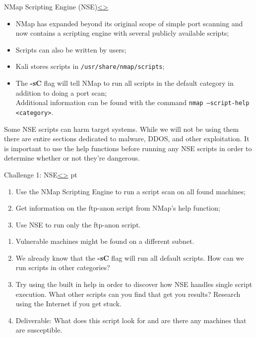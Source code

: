 \documentclass[12pt]{extarticle}
\newenvironment{instructionblock}{\Large\bgroup}{\egroup}
\begin{document}
\begin{slide}{NMap Scripting Engine (NSE)\cite{b2}}{\hyperref[slide 5]{\textless}\hyperref[slide 7]{\textgreater}}
	\begin{instructionblock}
		\begin{itemize}
			\item NMap has expanded beyond its original scope of simple port scanning and now contains a scripting engine with several publicly available scripts;
			\item Scripts can also be written by users;
			\item Kali stores scripts in \texttt{/usr/share/nmap/scripts};
			\item The \textbf{-sC} flag will tell NMap to run all scripts in the default category in addition to doing a port scan\cite{b1};
			\\
			Additional information can be found with the command \texttt{nmap --script-help <category>}.
		\end{itemize}
	\end{instructionblock}
\end{slide}
Some NSE scripts can harm target systems. While we will not be using them there are entire sections dedicated to malware, DDOS, and other exploitation. It is important to use the help functions before running any NSE scripts in order to determine whether or not they're dangerous\cite{b2}.

\pagebreak

\begin{slide}{Challenge 1: NSE}{\hyperref[slide 6]{\textless}\hyperref[slide 8]{\textgreater}}
	 pt
	\begin{instructionblock}
		\begin{enumerate}
			\item Use the NMap Scripting Engine to run a script scan on all found machines;
			\item Get information on the ftp-anon script from NMap's help function;
			\item Use NSE to run only the ftp-anon script.
		\end{enumerate}
	\end{instructionblock}
\end{slide}
\begin{enumerate}
	\item Vulnerable machines might be found on a different subnet.
	\item We already know that the \textbf{-sC} flag will run all default scripts. How can we run scripts in other categories?
	\item Try using the built in help in order to discover how NSE handles single script execution. What other scripts can you find that get you results? Research using the Internet if you get stuck.
	\item Deliverable: What does this script look for and are there any machines that are susceptible.
\end{enumerate}
\end{document}
